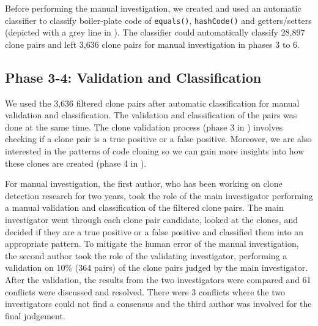 \documentclass[sigconf,review, anonymous]{acmart}
\begin{document}
Before performing the manual
investigation, we created and used an automatic classifier 
to classify boiler-plate code of {\small\texttt{equals()}}, 
{\small\texttt{hashCode()}} and getters/setters 
(depicted with a grey line in ).
The classifier could automatically classify 28,897 clone pairs 
and left 3,636 clone pairs for manual investigation in phases 3 to 6.

\subsection{Phase 3-4: Validation and Classification}
We used the 3,636 filtered clone pairs after automatic classification for
manual validation and classification.
The validation and classification of the pairs was done at the same time. 
The clone validation process (phase 3 in ) involves checking 
if a clone pair is a true positive or a false positive. 
Moreover, we are also interested in 
the patterns of code cloning so we can gain more insights into 
how these clones are created (phase 4 in ). 

For manual investigation, the first author, who has been working on clone detection research for 
two years, took the role of the main investigator performing a manual 
validation and classification of the filtered clone pairs. 
The main investigator went through each clone pair candidate, 
looked at the clones, and decided if they are a true positive or a
false positive and classified them into an appropriate pattern. 
To mitigate the human error of the manual investigation, 
the second author took the role of the validating investigator, performing a
validation on 10\% (364 pairs) of the clone pairs judged by the main
investigator. After the validation, the results from the two
investigators were compared and 61 conflicts were discussed and resolved.
There were 3 conflicts where the two investigators could not find a consensus 
and the third author was involved for the final judgement.
\end{document}

